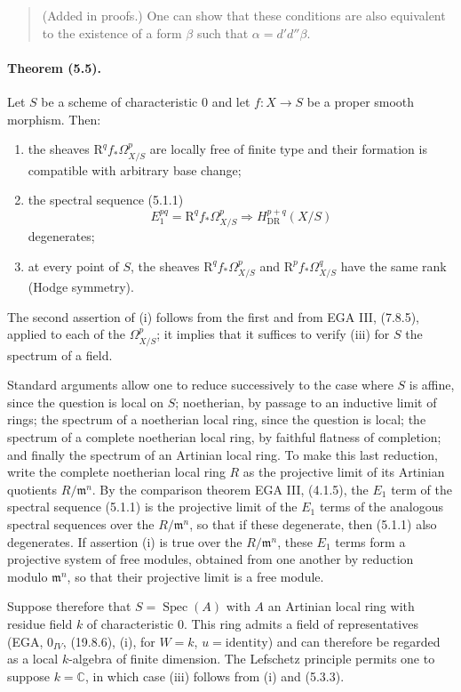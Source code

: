 \documentclass[10pt]{article}
\newcommand{\R}{\mathrm R}
\providecommand{\C}{\mathbb C}
\providecommand{\Spec}{\operatorname{Spec}}
\providecommand{\DR}{\operatorname{DR}}
\begin{document}
\begin{quote}\footnotesize
(Added in proofs.) One can show that these conditions are also equivalent to the existence of a form $\beta$ such that $\alpha=d'd''\beta$.
\end{quote}

\paragraph{Theorem (5.5).} Let $S$ be a scheme of characteristic $0$ and let $f:X\to S$ be a proper smooth morphism. Then:
\begin{enumerate}[label=(\roman*)]
\item the sheaves $\R^qf_*\Omega_{X/S}^p$ are locally free of finite type and their formation is compatible with arbitrary base change;
\item the spectral sequence (5.1.1)
\[
E_1^{pq}=\R^qf_*\Omega_{X/S}^p\Longrightarrow H_{\DR}^{p+q}(X/S)
\]
degenerates;
\item at every point of $S$, the sheaves $\R^qf_*\Omega_{X/S}^p$ and $\R^pf_*\Omega_{X/S}^q$ have the same rank (Hodge symmetry).
\end{enumerate}
The second assertion of (i) follows from the first and from EGA III, (7.8.5), applied to each of the $\Omega_{X/S}^p$; it implies that it suffices to verify (iii) for $S$ the spectrum of a field.

Standard arguments allow one to reduce successively to the case where $S$ is affine, since the question is local on $S$; noetherian, by passage to an inductive limit of rings; the spectrum of a noetherian local ring, since the question is local; the spectrum of a complete noetherian local ring, by faithful flatness of completion; and finally the spectrum of an Artinian local ring. To make this last reduction, write the complete noetherian local ring $R$ as the projective limit of its Artinian quotients $R/\mathfrak m^n$. By the comparison theorem EGA III, (4.1.5), the $E_1$ term of the spectral sequence (5.1.1) is the projective limit of the $E_1$ terms of the analogous spectral sequences over the $R/\mathfrak m^n$, so that if these degenerate, then (5.1.1) also degenerates. If assertion (i) is true over the $R/\mathfrak m^n$, these $E_1$ terms form a projective system of free modules, obtained from one another by reduction modulo $\mathfrak m^n$, so that their projective limit is a free module.

Suppose therefore that $S=\Spec(A)$ with $A$ an Artinian local ring with residue field $k$ of characteristic $0$. This ring admits a field of representatives (EGA, $0_{IV}$, (19.8.6), (i), for $W=k$, $u=\mathrm{identity}$) and can therefore be regarded as a local $k$-algebra of finite dimension. The Lefschetz principle permits one to suppose $k=\C$, in which case (iii) follows from (i) and (5.3.3).
\end{document}
